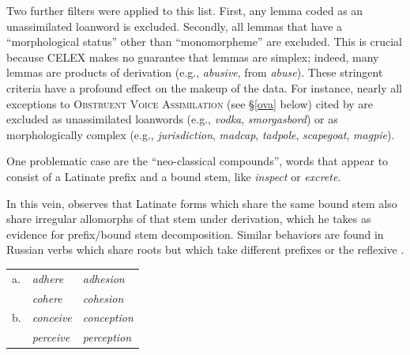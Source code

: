 Two further filters were applied to this list. First, any lemma coded as an unassimilated loanword is excluded. Secondly, all lemmas that have a ``morphological status'' other than ``monomorpheme'' are excluded. This is crucial because CELEX makes no guarantee that lemmas are simplex; indeed, many lemmas are products of derivation (e.g., \emph{abusive}, from \emph{abuse}). These stringent criteria have a profound effect on the makeup of the data. For instance, nearly all exceptions to \textsc{Obstruent Voice Assimilation} (see \S\ref{ova} below) cited by \citet[74]{Hammond1999a} are excluded as unassimilated loanwords (e.g., \emph{vodka}, \emph{smorgasbord}) or as morphologically complex (e.g., \emph{jurisdiction}, \emph{madcap}, \emph{tadpole}, \emph{scapegoat}, \emph{magpie}). 

One problematic case are the ``neo-classical compounds'', words that appear to consist of a Latinate prefix and a bound stem, like \emph{inspect} or \emph{excrete}. 



In this vein, \citet[11--13]{Aronoff1976} observes that Latinate forms which share the same bound stem also share irregular allomorphs of that stem under derivation, which he takes as evidence for prefix/bound stem decomposition. Similar behaviors are found in Russian verbs which share roots but which take different prefixes or the reflexive \citep{Pesetsky1977}.

\begin{example}
\begin{tabular}{l l l}
a. & \emph{adhere}   & \emph{adhesion}   \\
   & \emph{cohere}   & \emph{cohesion}   \\
b. & \emph{conceive} & \emph{conception} \\
   & \emph{perceive} & \emph{perception} \\
\end{tabular}
\end{example}

